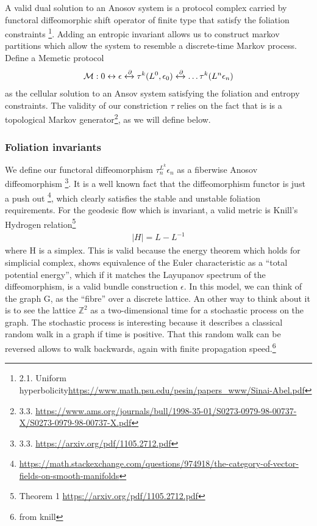 \documentclass{article}
\begin{document}
A valid dual solution to an Anosov system is a protocol complex carried by functoral diffeomorphic shift operator of finite type that satisfy the foliation constraints \footnote{2.1. Uniform hyperbolicity\url{https://www.math.psu.edu/pesin/papers_www/Sinai-Abel.pdf}}. Adding an entropic invariant allows us to construct markov partitions which allow the system to resemble a discrete-time Markov process. Define a Memetic protocol
\begin{equation} \label{eq1}
\begin{split}
\mathcal{M}: 0 \leftrightarrow \epsilon \xleftrightarrow{\partial} \tau^{k}(L^0, \epsilon_0) \xleftrightarrow{\partial} \dots \tau^{k}(L^n \epsilon_n)
\end{split}
\end{equation}
as the cellular solution to an Ansov system satisfying the foliation and entropy constraints. The validity of our constriction $\tau$ relies on the fact that is is a topological Markov generator\footnote{3.3. \url{https://www.ams.org/journals/bull/1998-35-01/S0273-0979-98-00737-X/S0273-0979-98-00737-X.pdf}}, as we will define below.

\subsubsection{Foliation invariants}
We define our functoral diffeomorphism $\tau^{L^k}_n \epsilon_n$ as a fiberwise Anosov diffeomorphism \footnote{3.3. \url{https://arxiv.org/pdf/1105.2712.pdf}}. It is a well known fact that the diffeomorphism functor is just a push out \footnote{\url{https://math.stackexchange.com/questions/974918/the-category-of-vector-fields-on-smooth-manifolds}}, which clearly satisfies the stable and unstable foliation requirements. For the geodesic flow which is invariant, a valid metric is Knill's Hydrogen relation\footnote{Theorem 1 \url{https://arxiv.org/pdf/1105.2712.pdf}}
\begin{equation} \label{eq1}
\begin{split}
|H| = L - L^{-1}
\end{split}
\end{equation}
where H is a simplex. This is valid because the energy theorem which holds for simplicial complex, shows equivalence of the Euler characteristic as a “total potential energy”, which if it matches the Layupanov spectrum of the diffeomorphism, is a valid bundle construction $\epsilon$. In this model, we can think of the graph G, as the “fibre” over a discrete lattice. An other way to think about it is to see the lattice $\mathbb{Z}^2$ as a two-dimensional time for a stochastic process on the graph. The stochastic process is interesting because it describes a classical random walk in a graph if time is positive. That this random walk can be reversed allows to walk backwards, again with finite propagation speed.\footnote{from knill}
\end{document}
